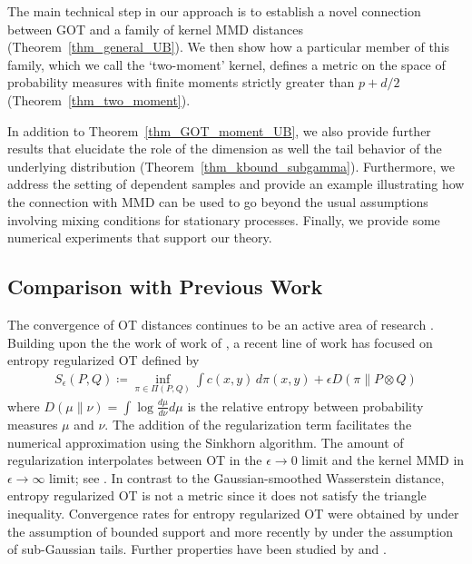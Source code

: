 \documentclass{article}
\theoremstyle{definition}
\newcommand{\eps}{\epsilon}
\begin{document}
The main technical step in our approach is to establish a novel connection between GOT and a family of kernel MMD distances (Theorem~\ref{thm_general_UB}). We then show how a particular member of this family, which we call the `two-moment' kernel,  defines a metric on the space of probability measures with finite moments strictly greater than $p + d/2$ (Theorem~\ref{thm_two_moment}). 

In addition to Theorem~\ref{thm_GOT_moment_UB}, we also provide  further results that elucidate the role of the dimension as well the tail behavior of the underlying distribution (Theorem~\ref{thm_kbound_subgamma}). Furthermore, we address the setting of dependent samples and provide an example illustrating how the connection with MMD can be used to go beyond the usual assumptions involving mixing conditions for stationary processes. Finally, we provide some numerical experiments that support our theory. 



\subsection{Comparison with Previous Work}
The convergence of OT distances continues to be an active area of research \cite{singh:2018,jonathan2019minmax,lei2020convergence}. Building upon the the work of work of \cite{cuturi2013sinkhorn}, a recent line of work has focused on entropy regularized OT defined by 
\begin{align*}
S_\eps(P,Q) \coloneqq \inf_{\pi \in \Pi(P,Q)} \int c(x,y) \, d\pi(x,y) + \epsilon D(\pi \| P \otimes Q)
\end{align*}
where $D(\mu \| \nu)= \int  \log \frac{ d \mu}{ d \nu} d \mu$ is the relative entropy between probability measures $\mu$ and $\nu$. The addition of the regularization term facilitates the numerical approximation using the  Sinkhorn algorithm. The amount of regularization interpolates between OT in the $\eps\to 0$ limit and the kernel MMD in $\eps\to \infty$ limit; see \cite{feydy2019interpolating}. In contrast to the Gaussian-smoothed Wasserstein distance, entropy regularized OT is not a metric since it does not satisfy the triangle inequality. Convergence rates for entropy regularized OT were obtained by  \cite{genevay2019sample} under the assumption of bounded support and more recently by \cite{mena:2019} under the assumption of sub-Gaussian tails.  Further properties have been studied by \cite{luise2018differential} and \cite{klatt2020empirical}.
\end{document}
